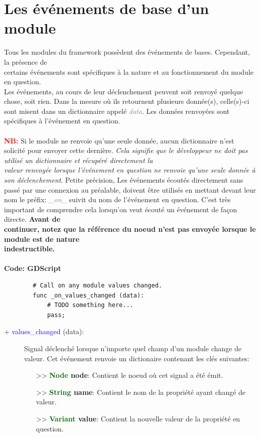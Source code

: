 \documentclass[a4paper, 11pt]{article}
\begin{document}
	\newpage \section{Les événements de base d'un module}
	Tous les modules du framework possèdent des événements de bases. Cependant, la présence de \\certains
	événements sont spécifiques à la nature et au fonctionnement du module en question.\\
	Les événements, au cours de leur déclenchement peuvent soit renvoyé quelque chose, soit rien. Dans la 
	mesure où ils retournent plusieurs donnée(s), celle(s)-ci sont misent dans un dictionnaire appelé 
	\textit{\textcolor{gray}{data}}. Les données renvoyées sont spécifiques à l'événement en question.\\\\
	\textbf{\textcolor{red}{NB:}} Si le module ne renvoie qu'une seule donnée, aucun dictionnaire n'est 
	solicité pour envoyer cette dernière. \textit{Cela signifie que le développeur ne doit pas utilisé un 
	dictionnaire et récupéré directement la \\valeur renvoyée lorsque l'événement en question ne renvoie 
	qu'une seule donnée à son déclenchement}. Petite précision, Les événements écoutés directement sans 
	passé par une connexion au préalable, doivent être utilisés en mettant devant leur nom le préfix: 
	\textit{\textcolor{gray}{\_on\_}} suivit du nom de l'événement en question. C'est très important de 
	comprendre cela lorsqu'on veut écouté un événement de façon directe. \textbf{Avant de \\continuer, notez
	que la référence du noeud n'est pas envoyée lorsque le module est de nature \\indestructible.}\\\\
	\textbf{Code: GDScript}
	\begin{lstlisting}
		# Call on any module values changed.
		func _on_values_changed (data):
			# TODO something here...
			pass;
	\end{lstlisting}
	\begin{description}
		\item [+ \textcolor{blue}{values\_changed} (data):] Signal déclenché lorsque n'importe quel champ 
		d'un module change de valeur. Cet événement renvoie un dictionaire contenant les clés suivantes:
		\begin{itemize}
			\item [>> \textbf{\textcolor{darkgreen}{Node} node}:] Contient le noeud où cet signal a été 
			émit.
			\item [>> \textbf{\textcolor{darkgreen}{String} name}:] Contient le nom de la propriété ayant
			changé de valeur.
			\item [>> \textbf{\textcolor{darkgreen}{Variant} value}:] Contient la nouvelle valeur de la
			propriété en question.\\
		\end{itemize}
	\end{description}
\end{document}
